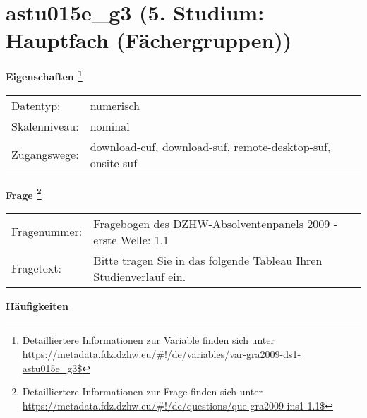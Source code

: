 
    \setcounter{footnote}{0}

    \vspace*{-1.8cm}
	\section{astu015e\_g3 (5. Studium: Hauptfach (Fächergruppen))}
	\label{section:astu015e_g3}



    \vspace*{0.5cm}
    \noindent\textbf{Eigenschaften
	\footnote{Detailliertere Informationen zur Variable finden sich unter
		\url{https://metadata.fdz.dzhw.eu/\#!/de/variables/var-gra2009-ds1-astu015e_g3$}}}\\
	\begin{tabularx}{\hsize}{@{}lX}
	Datentyp: & numerisch \\
	Skalenniveau: & nominal \\
	Zugangswege: &
	  download-cuf, 
	  download-suf, 
	  remote-desktop-suf, 
	  onsite-suf
 \\
    \end{tabularx}



				\vspace*{0.5cm}
                \noindent\textbf{Frage
	                \footnote{Detailliertere Informationen zur Frage finden sich unter
		              \url{https://metadata.fdz.dzhw.eu/\#!/de/questions/que-gra2009-ins1-1.1$}}}\\
				\begin{tabularx}{\hsize}{@{}lX}
					Fragenummer: &
					  Fragebogen des DZHW-Absolventenpanels 2009 - erste Welle:
					  1.1
 \\
					Fragetext: & Bitte tragen Sie in das folgende Tableau Ihren Studienverlauf ein. \\
				\end{tabularx}





        		\vspace*{0.5cm}
                \noindent\textbf{Häufigkeiten}

